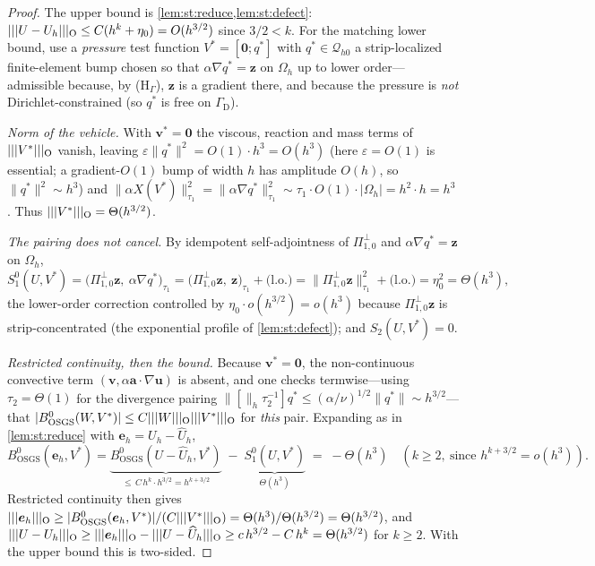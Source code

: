 \documentclass[11pt]{article}
\newcommand{\bu}{\boldsymbol{u}}
\newcommand{\bv}{\boldsymbol{v}}
\newcommand{\ba}{\boldsymbol{a}}
\newcommand{\bz}{\boldsymbol{z}}
\newcommand{\bzero}{\boldsymbol{0}}
\newcommand{\grad}{\nabla}
\newcommand{\Qhz}{\mathcal{Q}_{h0}}
\newcommand{\Ponez}{\Pi_{1,0}}
\newcommand{\normh}[1]{\lVert #1 \rVert_{h}}
\newcommand{\normtau}[1]{\lVert #1 \rVert_{\tau_{1}}}
\DeclarePairedDelimiter\vvvert{\lvert\lvert\lvert}{\rvert\rvert\rvert}
\newcommand{\tnorm}[1]{\vvvert{#1}}
\theoremstyle{plain}
\theoremstyle{definition}
\theoremstyle{remark}
\begin{document}
\begin{proof}
The upper bound is \cref{lem:st:reduce,lem:st:defect}:
$\tnorm{U-U_h}_{\mathrm{O}}\le C(h^k+\eta_0)=O(h^{3/2})$ since $3/2<k$. For the
matching lower bound, use a \emph{pressure} test function
$V^{\ast}=[\bzero;q^{\ast}]$ with $q^{\ast}\in\Qhz$ a strip-localized
finite-element bump chosen so that $\alpha\grad q^{\ast}=\bz$ on
$\Omega_h$ up to lower order---admissible because, by ($\mathrm{H}_\Gamma$),
$\bz$ is a gradient there, and because the pressure is \emph{not}
Dirichlet-constrained (so $q^{\ast}$ is free on $\Gamma_{\mathrm D}$).

\emph{Norm of the vehicle.} With $\bv^{\ast}=\bzero$ the viscous, reaction and
mass terms of $\tnorm{V^{\ast}}_{\mathrm{O}}$ vanish, leaving
$\varepsilon\|q^{\ast}\|^2=O(1)\cdot h^3=O(h^3)$ (here $\varepsilon=O(1)$ is
essential; a gradient-$O(1)$ bump of width $h$ has amplitude $O(h)$, so
$\|q^{\ast}\|^2\sim h^3$) and
$\normtau{\alpha X(V^{\ast})}^2=\normtau{\alpha\grad q^{\ast}}^2
\sim\tau_1\cdot O(1)\cdot|\Omega_h|=h^2\cdot h=h^3$. Thus
$\tnorm{V^{\ast}}_{\mathrm{O}}=\Theta(h^{3/2})$.

\emph{The pairing does not cancel.} By idempotent self-adjointness of
$\Ponez^{\perp}$ and $\alpha\grad q^{\ast}=\bz$ on $\Omega_h$,
\[
  S_1^{0}(U,V^{\ast})=\bigl(\Ponez^{\perp}\bz,\ \alpha\grad q^{\ast}\bigr)_{\tau_1}
  =\bigl(\Ponez^{\perp}\bz,\ \bz\bigr)_{\tau_1}+\text{(l.o.)}
  =\normtau{\Ponez^{\perp}\bz}^2+\text{(l.o.)}=\eta_0^2=\Theta(h^3),
\]
the lower-order correction controlled by $\eta_0\cdot o(h^{3/2})=o(h^3)$
because $\Ponez^{\perp}\bz$ is strip-concentrated (the exponential profile
of \cref{lem:st:defect}); and $S_2(U,V^{\ast})=0$.

\emph{Restricted continuity, then the bound.} Because $\bv^{\ast}=\bzero$, the
non-continuous convective term $(\bv,\alpha\ba\cdot\grad\bu)$ is absent,
and one checks termwise---using $\tau_2=\Theta(1)$ for the divergence pairing
$\normh[\tau_2^{-1}]{q^{\ast}}\le(\alpha/\nu)^{1/2}\|q^{\ast}\|\sim h^{3/2}$---that
$|B^{0}_{\mathrm{OSGS}}(W,V^{\ast})|\le C\tnorm{W}_{\mathrm{O}}\tnorm{V^{\ast}}_{\mathrm{O}}$
for \emph{this} pair. Expanding as in \cref{lem:st:reduce} with
$\boldsymbol e_h=U_h-\widehat U_h$,
\[
  B^{0}_{\mathrm{OSGS}}(\boldsymbol e_h,V^{\ast})
  =\underbrace{B^{0}_{\mathrm{OSGS}}(U-\widehat U_h,V^{\ast})}_{\le\,C\,h^{k}\cdot h^{3/2}=h^{k+3/2}}
  \;-\;\underbrace{S_1^{0}(U,V^{\ast})}_{\Theta(h^3)}
  \;=\;-\Theta(h^3)\quad(k\ge2,\ \text{since }h^{k+3/2}=o(h^3)).
\]
Restricted continuity then gives
$\tnorm{\boldsymbol e_h}_{\mathrm{O}}\ge |B^{0}_{\mathrm{OSGS}}(\boldsymbol e_h,V^{\ast})|/(C\tnorm{V^{\ast}}_{\mathrm{O}})
=\Theta(h^3)/\Theta(h^{3/2})=\Theta(h^{3/2})$, and
$\tnorm{U-U_h}_{\mathrm{O}}\ge\tnorm{\boldsymbol e_h}_{\mathrm{O}}-\tnorm{U-\widehat U_h}_{\mathrm{O}}
\ge c\,h^{3/2}-C\,h^{k}=\Theta(h^{3/2})$ for $k\ge2$. With the upper bound this
is two-sided.
\end{proof}
\end{document}
